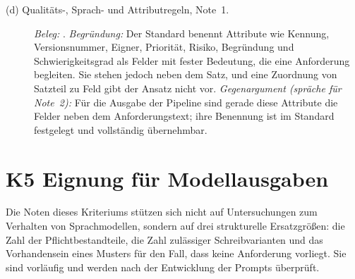 \documentclass[11pt,a4paper]{report}
\begin{document}
\begin{description}
  \item[(d) Qualitäts-, Sprach- und Attributregeln, Note~1.]
  \emph{Beleg:} \cite[Abschn.~5.2.8.1 und 5.2.8.2]{iso29148}.
  \emph{Begründung:} Der Standard benennt Attribute wie Kennung,
  Versionsnummer, Eigner, Priorität, Risiko, Begründung und
  Schwierigkeitsgrad als Felder mit fester Bedeutung, die eine
  Anforderung begleiten. Sie stehen jedoch neben dem Satz, und eine
  Zuordnung von Satzteil zu Feld gibt der Ansatz nicht vor.
  \emph{Gegenargument (spräche für Note~2):} Für die Ausgabe der
  Pipeline sind gerade diese Attribute die Felder neben dem
  Anforderungstext; ihre Benennung ist im Standard festgelegt und
  vollständig übernehmbar.
\end{description}


\section{K5 Eignung für Modellausgaben}
\label{sec:anhang-k5}

Die Noten dieses Kriteriums stützen sich nicht auf Untersuchungen zum
Verhalten von Sprachmodellen, sondern auf drei strukturelle
Ersatzgrößen: die Zahl der Pflichtbestandteile, die Zahl zulässiger
Schreibvarianten und das Vorhandensein eines Musters für den Fall, dass
keine Anforderung vorliegt. Sie sind vorläufig und werden nach der
Entwicklung der Prompts überprüft.
\end{document}
